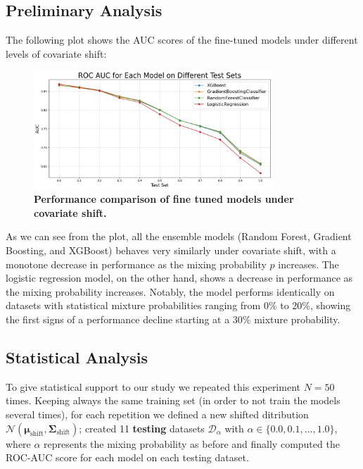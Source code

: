 \subsection{Preliminary Analysis}

The following plot shows the AUC scores of the fine-tuned models under different levels of covariate shift:

\begin{figure}[H]
    \centering
    \includegraphics[width=0.8\textwidth]{assets/auc_comp.png} 
    \caption{\textbf{Performance comparison of fine tuned models under covariate shift.}}
    \label{fig:tuned-models-perf}
\end{figure}

As we can see from the plot, all the ensemble models (Random Forest, Gradient Boosting, and XGBoost) behaves very similarly under covariate shift, with a monotone decrease in performance as the mixing probability $p$ increases. The logistic regression model, on the other hand, shows a decrease in performance as the mixing probability increases. Notably, the model performs identically on datasets with statistical mixture probabilities ranging from 0\% to 20\%, showing the first signs of a performance decline starting at a 30\% mixture probability.

\subsection{Statistical Analysis}

To give statistical support to our study we repeated this experiment $N = 50$ times. Keeping always the same training set (in order to not train the models several times), for each repetition we 
defined a new shifted ditribution $\mathcal{N}(\boldsymbol{\mu}_{\text{shift}}, \boldsymbol{\Sigma}_{\text{shift}}) $;
created 11 \textbf{testing} datasets $\mathcal{D}_\alpha$ with $\alpha \in \{0.0, 0.1, \ldots, 1.0\}$, where $\alpha$ represents the mixing probability as before and finally computed the ROC-AUC score for each model on each testing dataset.

